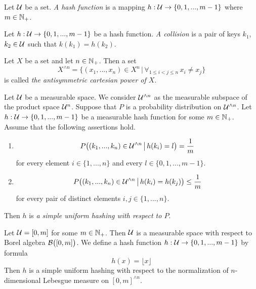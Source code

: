 \begin{definition}
Let ${\mathcal U}$ be a set. \textit{A hash function} is a mapping $h:{\mathcal U}\rightarrow \{0,1,...,m-1\}$ where $m\in {\mathbb N}_+$.
\end{definition}

\begin{definition}
Let $h:{\mathcal U} \rightarrow \{0,1,...,m-1\}$ be a hash function. \textit{A collision} is a pair of keys $k_1$, $k_2\in {\mathcal U}$ such that $k(k_1) = h(k_2)$.
\end{definition}

\begin{definition}
Let $X$ be a set and let $n\in {\mathbb N}_+$. Then a set
$$X^{\wedge n} = \big\{(x_1,...,x_n)\in X^{n}\,\big|\,\forall_{1\leq i < j \leq n}\,x_i\neq x_j\big\}$$
is called \textit{the antisymmetric cartesian power of $X$}.
\end{definition}

\begin{definition}
Let ${\mathcal U}$ be a measurable space. We consider ${\mathcal U}^{\wedge n}$ as the measurable subspace of the product space ${\mathcal U}^{n}$. Suppose that $P$ is a probability distribution on ${\mathcal U}^{\wedge n}$. Let $h:{\mathcal U}\rightarrow \{0,1,...,m-1\}$ be a measurable hash function for some $m\in {\mathbb N}_+$. Assume that the following assertions hold.
\begin{enumerate}[label=\textbf{(\arabic*)}, leftmargin=*]
\item $$P\big((k_1,...,k_n)\in {\mathcal U}^{\wedge n}\,\big|\,h(k_i) = l\big) = \frac{1}{m}$$
for every element $i\in \{1,...,n\}$ and every $l\in \{0,1,...,m-1\}$.
\item $$P\big((k_1,...,k_n)\in {\mathcal U}^{\wedge n}\,\big|\,h(k_i) = h(k_j)\big) \leq \frac{1}{m}$$
for every pair of distinct elements $i,j\in \{1,...,n\}$.
\end{enumerate}
Then $h$ is \textit{a simple uniform hashing with respect to $P$}.
\end{definition}

\begin{example}\label{example:real_interval_with_floor_hash_function_as_an_example_of_suh}
Let ${\mathcal U} = [0,m]$ for some $m\in {\mathbb N}_+$. Then ${\mathcal U}$ is a measurable space with respect to Borel algebra ${\mathcal B}\big([0,m]\big)$. We define a hash function $h:{\mathcal U}\rightarrow \{0,1,...,m-1\}$ by formula
$$h(x) = \lfloor x \rfloor$$
Then $h$ is a simple uniform hashing with respect to the normalization of $n$-dimensional Lebesgue measure on $[0,m]^{\wedge n}$.
\end{example}


